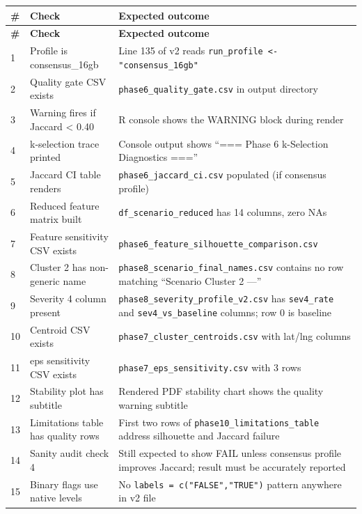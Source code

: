 \documentclass[11pt]{article}
\newcommand{\rcode}[1]{\texttt{#1}}
\begin{document}
\begin{longtable}{|p{0.5cm}|p{4.5cm}|p{8.5cm}|}
\hline
\textbf{\#} & \textbf{Check} & \textbf{Expected outcome} \\
\hline
\endfirsthead
\hline
\textbf{\#} & \textbf{Check} & \textbf{Expected outcome} \\
\hline
\endhead
1 & Profile is consensus\_16gb & Line 135 of v2 reads \rcode{run\_profile <- "consensus\_16gb"} \\
\hline
2 & Quality gate CSV exists & \rcode{phase6\_quality\_gate.csv} in output directory \\
\hline
3 & Warning fires if Jaccard < 0.40 & R console shows the WARNING block during render \\
\hline
4 & k-selection trace printed & Console output shows ``=== Phase 6 k-Selection Diagnostics ==='' \\
\hline
5 & Jaccard CI table renders & \rcode{phase6\_jaccard\_ci.csv} populated (if consensus profile) \\
\hline
6 & Reduced feature matrix built & \rcode{df\_scenario\_reduced} has 14 columns, zero NAs \\
\hline
7 & Feature sensitivity CSV exists & \rcode{phase6\_feature\_silhouette\_comparison.csv} \\
\hline
8 & Cluster 2 has non-generic name & \rcode{phase8\_scenario\_final\_names.csv} contains no row matching ``Scenario Cluster 2 ---'' \\
\hline
9 & Severity 4 column present & \rcode{phase8\_severity\_profile\_v2.csv} has \rcode{sev4\_rate} and \rcode{sev4\_vs\_baseline} columns; row 0 is baseline \\
\hline
10 & Centroid CSV exists & \rcode{phase7\_cluster\_centroids.csv} with lat/lng columns \\
\hline
11 & eps sensitivity CSV exists & \rcode{phase7\_eps\_sensitivity.csv} with 3 rows \\
\hline
12 & Stability plot has subtitle & Rendered PDF stability chart shows the quality warning subtitle \\
\hline
13 & Limitations table has quality rows & First two rows of \rcode{phase10\_limitations\_table} address silhouette and Jaccard failure \\
\hline
14 & Sanity audit check 4 & Still expected to show FAIL unless consensus profile improves Jaccard; result must be accurately reported \\
\hline
15 & Binary flags use native levels & No \rcode{labels = c("FALSE","TRUE")} pattern anywhere in v2 file \\
\hline
\end{longtable}
\end{document}
